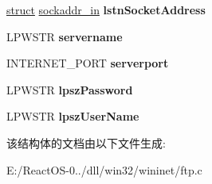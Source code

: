 \begin{DoxyCompactItemize}
\hyperlink{interfacestruct}{struct} \hyperlink{structsockaddr__in}{sockaddr\+\_\+in} {\bfseries lstn\+Socket\+Address}
\item 
\mbox{\label{struct__ftp__session__t_a6d23e82b1e90a24577f7a20ad8d9fdb2}} 
L\+P\+W\+S\+TR {\bfseries servername}
\item 
\mbox{\label{struct__ftp__session__t_a7797c14bc08c9663cfc81a85e0b063bd}} 
I\+N\+T\+E\+R\+N\+E\+T\+\_\+\+P\+O\+RT {\bfseries serverport}
\item 
\mbox{\label{struct__ftp__session__t_ab93b238543a9122717e7f74281107487}} 
L\+P\+W\+S\+TR {\bfseries lpsz\+Password}
\item 
\mbox{\label{struct__ftp__session__t_af89683851c9f66e78c22979b390225e1}} 
L\+P\+W\+S\+TR {\bfseries lpsz\+User\+Name}
\end{DoxyCompactItemize}


该结构体的文档由以下文件生成\+:\begin{DoxyCompactItemize}
\item 
E\+:/\+React\+O\+S-\/0../dll/win32/wininet/ftp.\+c\end{DoxyCompactItemize}
